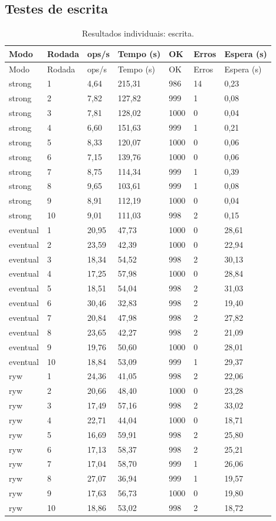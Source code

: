 \subsection{Testes de escrita}
\begingroup\small\setlength{\tabcolsep}{4pt}
\begin{longtable}{lllllll}
\caption{Resultados individuais: escrita.}\\
\toprule
Modo & Rodada & ops/s & Tempo (s) & OK & Erros & Espera (s)\\\midrule\endfirsthead
\toprule
Modo & Rodada & ops/s & Tempo (s) & OK & Erros & Espera (s)\\\midrule\endhead
\bottomrule\endfoot
strong & 1 & 4,64 & 215,31 & 986 & 14 & 0,23\\
strong & 2 & 7,82 & 127,82 & 999 & 1 & 0,08\\
strong & 3 & 7,81 & 128,02 & 1000 & 0 & 0,04\\
strong & 4 & 6,60 & 151,63 & 999 & 1 & 0,21\\
strong & 5 & 8,33 & 120,07 & 1000 & 0 & 0,06\\
strong & 6 & 7,15 & 139,76 & 1000 & 0 & 0,06\\
strong & 7 & 8,75 & 114,34 & 999 & 1 & 0,39\\
strong & 8 & 9,65 & 103,61 & 999 & 1 & 0,08\\
strong & 9 & 8,91 & 112,19 & 1000 & 0 & 0,04\\
strong & 10 & 9,01 & 111,03 & 998 & 2 & 0,15\\
eventual & 1 & 20,95 & 47,73 & 1000 & 0 & 28,61\\
eventual & 2 & 23,59 & 42,39 & 1000 & 0 & 22,94\\
eventual & 3 & 18,34 & 54,52 & 998 & 2 & 30,13\\
eventual & 4 & 17,25 & 57,98 & 1000 & 0 & 28,84\\
eventual & 5 & 18,51 & 54,04 & 998 & 2 & 31,03\\
eventual & 6 & 30,46 & 32,83 & 998 & 2 & 19,40\\
eventual & 7 & 20,84 & 47,98 & 998 & 2 & 27,82\\
eventual & 8 & 23,65 & 42,27 & 998 & 2 & 21,09\\
eventual & 9 & 19,76 & 50,60 & 1000 & 0 & 28,01\\
eventual & 10 & 18,84 & 53,09 & 999 & 1 & 29,37\\
ryw & 1 & 24,36 & 41,05 & 998 & 2 & 22,06\\
ryw & 2 & 20,66 & 48,40 & 1000 & 0 & 23,28\\
ryw & 3 & 17,49 & 57,16 & 998 & 2 & 33,02\\
ryw & 4 & 22,71 & 44,04 & 1000 & 0 & 18,71\\
ryw & 5 & 16,69 & 59,91 & 998 & 2 & 25,80\\
ryw & 6 & 17,13 & 58,37 & 998 & 2 & 25,21\\
ryw & 7 & 17,04 & 58,70 & 999 & 1 & 26,06\\
ryw & 8 & 27,07 & 36,94 & 999 & 1 & 19,57\\
ryw & 9 & 17,63 & 56,73 & 1000 & 0 & 19,80\\
ryw & 10 & 18,86 & 53,02 & 998 & 2 & 18,72\\
\end{longtable}
\endgroup

